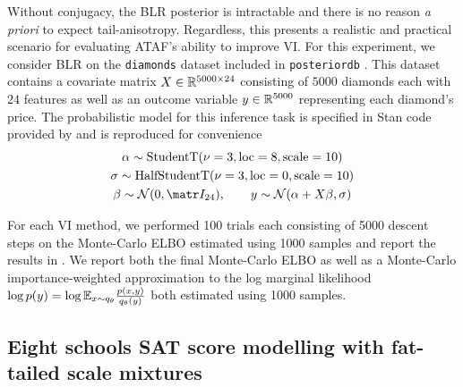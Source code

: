 \documentclass[twoside]{article}
\theoremstyle{definition}
\theoremstyle{remark}
\begin{document}
Without conjugacy, the BLR posterior is intractable and there is no reason \emph{a priori} to expect tail-anisotropy.
Regardless, this presents a realistic and practical scenario for evaluating ATAF's ability to improve VI.
For this experiment, we consider BLR on the \texttt{diamonds} dataset \citep{wickham2011ggplot2} included in
\texttt{posteriordb} \citep{ghposteriordb}.
This dataset contains a covariate matrix $X \in \mathbb{R}^{5000 \times 24}$ consisting of $5000$
diamonds each with $24$ features as well as an outcome variable $y \in \mathbb{R}^{5000}$ representing each diamond's price.
The probabilistic model for this inference task is specified in Stan code provided by \citep{ghposteriordb} and is reproduced
for convenience
\begin{gather*}
    \alpha \sim \text{StudentT}(\nu=3, \text{loc}=8, \text{scale}=10)\\
    \sigma \sim \text{HalfStudentT}(\nu=3, \text{loc}=0, \text{scale}=10)\\
    \beta \sim \cN(0, \mI_{24}),\qquad
    y \sim \cN(\alpha + X \beta, \sigma)
\end{gather*}

For each VI method, we performed 100 trials each consisting of 5000 descent steps
on the Monte-Carlo ELBO estimated using 1000 samples and report the results in
. We report both the final Monte-Carlo ELBO
as well as a Monte-Carlo importance-weighted approximation to
the log marginal likelihood $\log p(y) = \log \mathbb{E}_{x \sim q_\theta} \frac{p(x,y)}{q_\theta(y)}$
both estimated using 1000 samples.







\subsection{Eight schools SAT score modelling with fat-tailed scale mixtures}
\label{ssec:eight_schools}
\end{document}

